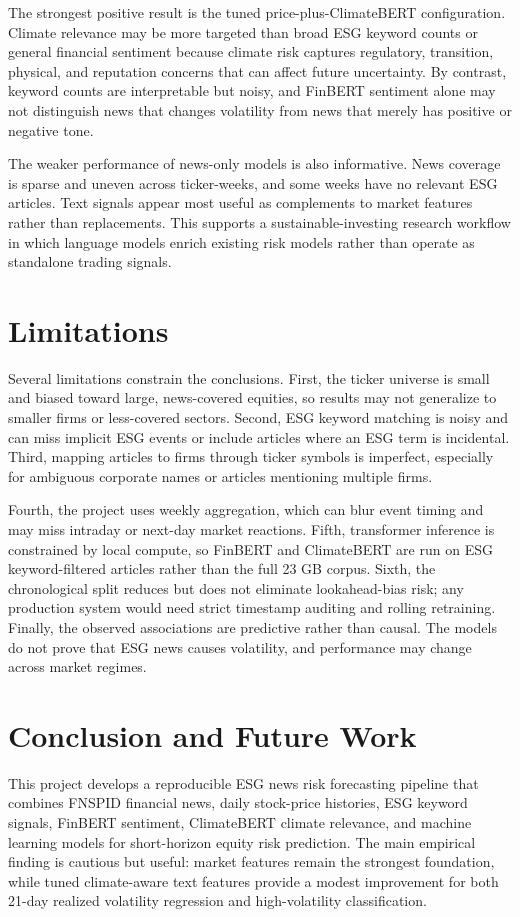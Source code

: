 \documentclass[sigconf,nonacm]{acmart}
\begin{document}
The strongest positive result is the tuned price-plus-ClimateBERT configuration. Climate relevance may be more targeted than broad ESG keyword counts or general financial sentiment because climate risk captures regulatory, transition, physical, and reputation concerns that can affect future uncertainty. By contrast, keyword counts are interpretable but noisy, and FinBERT sentiment alone may not distinguish news that changes volatility from news that merely has positive or negative tone.

The weaker performance of news-only models is also informative. News coverage is sparse and uneven across ticker-weeks, and some weeks have no relevant ESG articles. Text signals appear most useful as complements to market features rather than replacements. This supports a sustainable-investing research workflow in which language models enrich existing risk models rather than operate as standalone trading signals.

\section{Limitations}
Several limitations constrain the conclusions. First, the ticker universe is small and biased toward large, news-covered equities, so results may not generalize to smaller firms or less-covered sectors. Second, ESG keyword matching is noisy and can miss implicit ESG events or include articles where an ESG term is incidental. Third, mapping articles to firms through ticker symbols is imperfect, especially for ambiguous corporate names or articles mentioning multiple firms.

Fourth, the project uses weekly aggregation, which can blur event timing and may miss intraday or next-day market reactions. Fifth, transformer inference is constrained by local compute, so FinBERT and ClimateBERT are run on ESG keyword-filtered articles rather than the full 23 GB corpus. Sixth, the chronological split reduces but does not eliminate lookahead-bias risk; any production system would need strict timestamp auditing and rolling retraining. Finally, the observed associations are predictive rather than causal. The models do not prove that ESG news causes volatility, and performance may change across market regimes.

\section{Conclusion and Future Work}
This project develops a reproducible ESG news risk forecasting pipeline that combines FNSPID financial news, daily stock-price histories, ESG keyword signals, FinBERT sentiment, ClimateBERT climate relevance, and machine learning models for short-horizon equity risk prediction. The main empirical finding is cautious but useful: market features remain the strongest foundation, while tuned climate-aware text features provide a modest improvement for both 21-day realized volatility regression and high-volatility classification.
\end{document}
